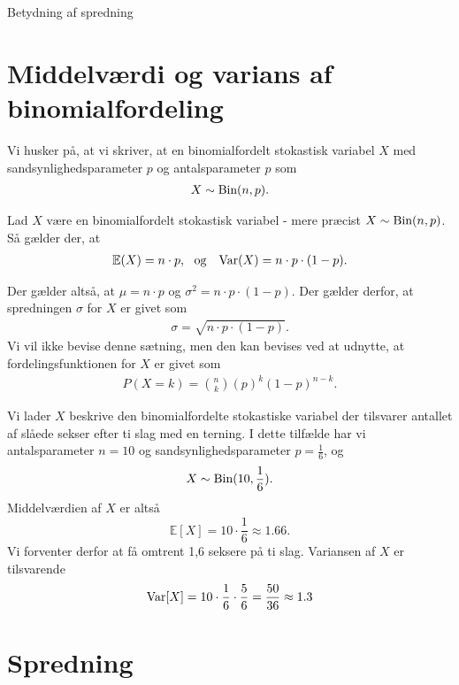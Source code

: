 \begin{center}
\Huge
Betydning af spredning
\end{center}

\section*{Middelværdi og varians af binomialfordeling}
Vi husker på, at vi skriver, at en binomialfordelt stokastisk variabel $X$ med sandsynlighedsparameter $p$ og antalsparameter $p$ som
\begin{align*}
X \sim \textnormal{Bin}(n,p).
\end{align*}

\begin{setn}
Lad $X$ være en binomialfordelt stokastisk variabel - mere præcist $X \sim \textnormal{Bin}(n,p)$. Så gælder der, at 
\begin{align*}
\mathbb{E}(X) &= n\cdot p,\ \textnormal{ og}
&\textnormal{Var}(X) = n\cdot p\cdot (1-p). 
\end{align*} 
\end{setn}
Der gælder altså, at $\mu = n\cdot p$ og $\sigma^2 = n\cdot p\cdot (1-p)$. Der gælder derfor, at spredningen $\sigma$ for $X$ er givet som
\begin{align*}
\sigma = \sqrt{n\cdot p\cdot(1-p)}.
\end{align*}
Vi vil ikke bevise denne sætning, men den kan bevises ved at udnytte, at fordelingsfunktionen for $X$ er givet som
\begin{align*}
P(X = k) = \binom{n}{k}(p)^k(1-p)^{n-k}.
\end{align*}
\begin{exa}
Vi lader $X$ beskrive den binomialfordelte stokastiske variabel der tilsvarer antallet af slåede sekser efter ti slag med en terning. I dette tilfælde har vi antalsparameter $n = 10$ og sandsynlighedsparameter $p = \frac{1}{6}$, og 
\begin{align*}
X \sim \textnormal{Bin}(10,\frac{1}{6}). 
\end{align*}
Middelværdien af $X$ er altså
\[
\mathbb{E}[X] = 10\cdot \frac{1}{6} \approx 1.66.
\]
Vi forventer derfor at få omtrent 1,6 seksere på ti slag.
Variansen af $X$ er tilsvarende
\begin{align*}
\textnormal{Var}[X] = 10\cdot \frac{1}{6}\cdot \frac{5}{6} = \frac{50}{36} \approx 1.3
\end{align*}
\end{exa}

\section*{Spredning}


